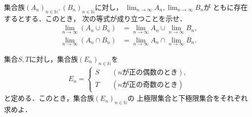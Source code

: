     \begin{que} \label{que:limitsetcupcap}
      集合族$(A_n)_{n \in \mathbb{N}},  (B_n)_{n \in \mathbb{N}}$に対し，
      $\displaystyle \lim_{n \to \infty} A_n ,  \lim_{n \to \infty} B_n$が
      ともに存在するとする．このとき，
      次の等式が成り立つことを示せ．
      \begin{align}
        \lim_{n \to \infty} (A_n \cup B_n) 
        & = \lim_{n \to \infty} A_n \cup \lim_{n \to \infty} B_n ,
        \label{eq:limitsetcup} \\
        \lim_{n \to \infty} (A_n \cap B_n) 
        & = \lim_{n \to \infty} A_n \cap \lim_{n \to \infty} B_n .
        \label{eq:limitsetcap}
      \end{align}
    \end{que}


    \begin{que} \label{que:limitsetoddeven}
      集合$S,  T$に対し，集合族$(E_n)_{n \in \mathbb{N}}$を
      \begin{align*}
        E_n =  \left\{
          \begin{aligned}
            S \quad & (\text{$n$が正の偶数のとき}) , \\
            T \quad & (\text{$n$が正の奇数のとき})
          \end{aligned} \right.
      \end{align*}
      と定める．このとき，集合族$(E_n) _{n \in \mathbb{N}}$の
      上極限集合と下極限集合をそれぞれ求めよ．
    \end{que}
      




